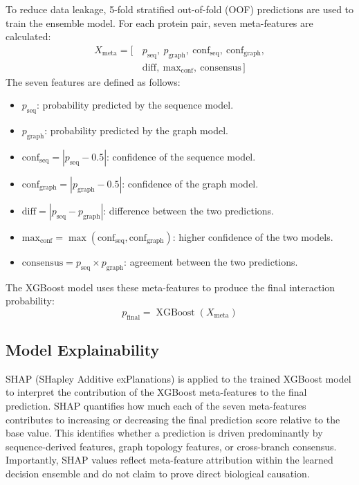 \documentclass[conference]{IEEEtran}
\newcommand{\pseq}{p_{\mathrm{seq}}}
\newcommand{\pgraph}{p_{\mathrm{graph}}}
\newcommand{\pfinal}{p_{\mathrm{final}}}
\begin{document}
To reduce data leakage, 5-fold stratified out-of-fold (OOF) predictions are
used to train the ensemble model. For each protein pair, seven meta-features
are calculated:
\begin{equation}
\begin{split}
X_{\mathrm{meta}} = [\,&\pseq,\ \pgraph,\ \mathrm{conf}_{\mathrm{seq}},\
\mathrm{conf}_{\mathrm{graph}},\\
&\mathrm{diff},\ \mathrm{max}_{\mathrm{conf}},\
\mathrm{consensus}\,]
\end{split}
\label{eq:meta}
\end{equation}
The seven features are defined as follows:
\begin{itemize}
    \item $\pseq$: probability predicted by the sequence model.
    \item $\pgraph$: probability predicted by the graph model.
    \item $\mathrm{conf}_{\mathrm{seq}} = |\pseq - 0.5|$: confidence of the
          sequence model.
    \item $\mathrm{conf}_{\mathrm{graph}} = |\pgraph - 0.5|$: confidence of
          the graph model.
    \item $\mathrm{diff} = |\pseq - \pgraph|$: difference between the two
          predictions.
    \item $\mathrm{max}_{\mathrm{conf}} =
          \max(\mathrm{conf}_{\mathrm{seq}},\mathrm{conf}_{\mathrm{graph}})$:
          higher confidence of the two models.
    \item $\mathrm{consensus} = \pseq \times \pgraph$: agreement between the
          two predictions.
\end{itemize}
The XGBoost model uses these meta-features to produce the final interaction
probability:
\begin{equation}
\pfinal = \operatorname{XGBoost}(X_{\mathrm{meta}})
\label{eq:final}
\end{equation}

\subsection{Model Explainability}\label{sec:shap}
SHAP (SHapley Additive exPlanations) is applied to the trained XGBoost model to
interpret the contribution of the XGBoost meta-features to the final prediction.
SHAP quantifies how much each of the seven meta-features contributes to increasing
or decreasing the final prediction score relative to the base value. This identifies
whether a prediction is driven predominantly by sequence-derived features, graph
topology features, or cross-branch consensus. Importantly, SHAP values reflect
meta-feature attribution within the learned decision ensemble and do not claim to
prove direct biological causation.
\end{document}
